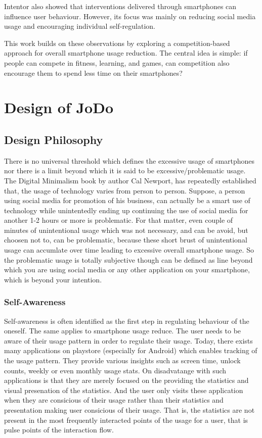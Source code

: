 \documentclass[11pt]{report}
\begin{document}
Intentor also showed that interventions delivered through smartphones can influence user 
behaviour. However, its focus was mainly on reducing social media usage and encouraging 
individual self-regulation.

This work builds on these observations by exploring a competition-based approach for 
overall smartphone usage reduction. The central idea is simple: if people can compete in 
fitness, learning, and games, can competition also encourage them to spend less time on 
their smartphones?



\newpage
\chapter{Design of JoDo}
\section{Design Philosophy}

There is no universal threshold which defines the excessive usage of smartphones nor there is a limit beyond which it is said to be excessive/problematic usage.
The Digital Minimalism book by author Cal Newport, has repeatedly established that, the usage of technology varies from person to person. 
Suppose, a person using social media for promotion of his business, can actually be a smart use of technology while unintentedly ending up continuing the use of social media for another 1-2 hours or more is problematic. 
For that matter, even couple of minutes of unintentional usage which was not necessary, and can be avoid, but choosen not to, can be problematic, because these short brust of unintentional usage can accumlate over time leading to excessive overall smartphone usage. 
So the problematic usage is totally subjective though can be defined as line beyond which you are using social media or any other application on your smartphone, which is beyond your intention.


\subsection{Self-Awareness}
Self-awareness is often identified as the first step in regulating behaviour of the oneself. The same applies to smartphone usage reduce. 
The user needs to be aware of their usage pattern in order to regulate their usage. Today, there exists many applications on playstore (especially for Android) which enables tracking of the usage pattern. They provide various insights such as screen time, unlock counts, weekly or even monthly usage stats. 
On disadvatange with such applications is that they are merely focused on the providing the statistics and visual presenation of the statistics. And the user only visits these application when they are consicious of their usage rather than their statistics and presentation making user consicious of their usage. 
That is, the statistics are not present in the most frequently interacted points of the usage for a user, that is pulse points of the interaction flow. 
\end{document}
